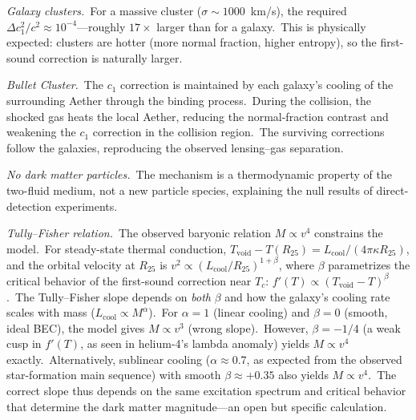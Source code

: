 ﻿\documentclass[12pt,letterpaper]{article}
\begin{document}
\emph{Galaxy clusters.}\ For a massive cluster ($\sigma \sim
1000$~km/s), the required $\Delta c_1^2/c^2 \approx 10^{-4}$---roughly
$17\times$ larger than for a galaxy.\ This is physically expected: clusters
are hotter (more normal fraction, higher entropy), so the first-sound
correction is naturally larger.

\emph{Bullet Cluster.}\ The $c_1$ correction is maintained by each
galaxy's cooling of the surrounding Aether through the binding process.\
During the collision, the shocked gas heats the local Aether, reducing the
normal-fraction contrast and weakening the $c_1$ correction in the collision
region.\ The surviving corrections follow the galaxies, reproducing the
observed lensing--gas separation.

\emph{No dark matter particles.}\ The mechanism is a thermodynamic
property of the two-fluid medium, not a new particle species, explaining
the null results of direct-detection experiments.

\emph{Tully--Fisher relation.}\ The observed baryonic relation
$M \propto v^4$ constrains the model.\ For steady-state thermal
conduction, $T_{\mathrm{void}} - T(R_{25}) = L_{\mathrm{cool}}/(4\pi
\kappa R_{25})$, and the orbital velocity at $R_{25}$ is
$v^2 \propto (L_{\mathrm{cool}}/R_{25})^{1+\beta}$, where
$\beta$ parametrizes the critical behavior of the first-sound
correction near $T_c$: $f'(T) \propto (T_{\mathrm{void}} - T)^\beta$.\
The Tully--Fisher slope depends on \emph{both} $\beta$ and how the
galaxy's cooling rate scales with mass ($L_{\mathrm{cool}} \propto
M^\alpha$).\ For $\alpha = 1$ (linear cooling) and $\beta = 0$
(smooth, ideal BEC), the model gives $M \propto v^3$ (wrong slope).\
However, $\beta = -1/4$ (a weak cusp in $f'(T)$, as seen in
helium-4's lambda anomaly) yields $M \propto v^4$ exactly.\
Alternatively, sublinear cooling ($\alpha \approx 0.7$, as expected
from the observed star-formation main sequence) with smooth $\beta
\approx +0.35$ also yields $M \propto v^4$.\ The correct slope thus
depends on the same excitation spectrum and critical behavior that
determine the dark matter magnitude---an open but specific calculation.
\end{document}
